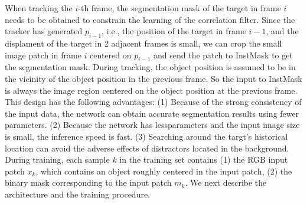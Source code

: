 \documentclass[review]{elsarticle}
\begin{document}
\begin{CJK*}{UTF8}{gbsn}
When tracking the $i$-th frame, the segmentation mask of the target in frame $i$ needs to be obtained to constrain the learning of the correlation filter. Since the tracker has generated $p_{i-1}$, i.e., the position of the target in frame $i-1$, and the displament of the target in 2 adjacent frames is small, we can crop the small image patch in frame $i$ centered on $p_{i-1}$ and send the patch to InstMask to get the segmentation mask.
During tracking, the object position is assumed to be in the vicinity of the object position in the previous frame. So the input to InstMask is always the image region centered on the object position at the previous frame.
This design has the following advantages: (1) Because of the strong consistency of the input data, the network can obtain accurate segmentation results using fewer parameters. (2) Because the network has lessparameters and the input image size is small, the inference speed is fast. (3) Searching around the targt's historical location can avoid the adverse effects of distractors located in the background. During training, each sample $k$ in the training set contains (1) the RGB input patch $x_k$, which contains an object roughly centered in the input patch, (2) the binary mask corresponding to the input patch $m_k$.
We next describe the architecture and the training procedure.



\end{CJK*}
\end{document}
